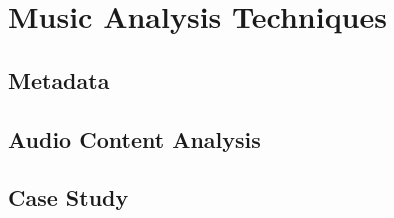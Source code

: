 \chapter{Music Analysis Techniques} %

\label{Chapter2} %



\section{Metadata}
\section{Audio Content Analysis}
\section{Case Study}